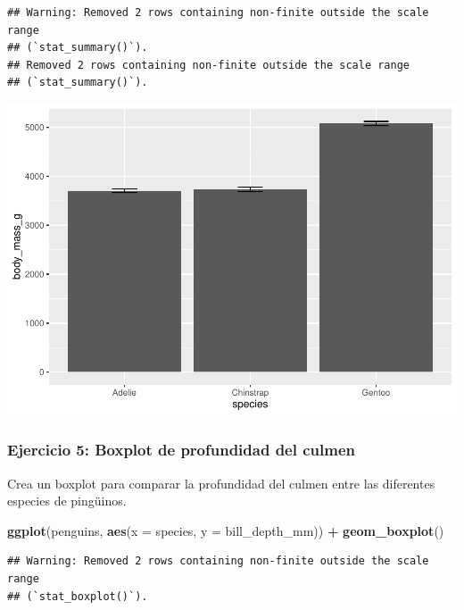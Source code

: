 \documentclass[
]{book}
\newenvironment{Shaded}{\begin{snugshade}}{\end{snugshade}}
\newcommand{\AttributeTok}[1]{\textcolor[rgb]{0.13,0.29,0.53}{#1}}
\newcommand{\FunctionTok}[1]{\textcolor[rgb]{0.13,0.29,0.53}{\textbf{#1}}}
\newcommand{\NormalTok}[1]{#1}
\newcommand{\SpecialCharTok}[1]{\textcolor[rgb]{0.81,0.36,0.00}{\textbf{#1}}}
\begin{document}
\begin{verbatim}
## Warning: Removed 2 rows containing non-finite outside the scale range
## (`stat_summary()`).
## Removed 2 rows containing non-finite outside the scale range
## (`stat_summary()`).
\end{verbatim}

\includegraphics{bookdown-demo_files/figure-latex/unnamed-chunk-186-1.pdf}

\subsubsection{Ejercicio 5: Boxplot de profundidad del culmen}\label{ejercicio-5-boxplot-de-profundidad-del-culmen}

Crea un boxplot para comparar la profundidad del culmen entre las diferentes especies de pingüinos.

\begin{Shaded}
\begin{Highlighting}[]
\FunctionTok{ggplot}\NormalTok{(penguins, }\FunctionTok{aes}\NormalTok{(}\AttributeTok{x =}\NormalTok{ species, }\AttributeTok{y =}\NormalTok{ bill\_depth\_mm)) }\SpecialCharTok{+}
  \FunctionTok{geom\_boxplot}\NormalTok{()}
\end{Highlighting}
\end{Shaded}

\begin{verbatim}
## Warning: Removed 2 rows containing non-finite outside the scale range
## (`stat_boxplot()`).
\end{verbatim}
\end{document}
